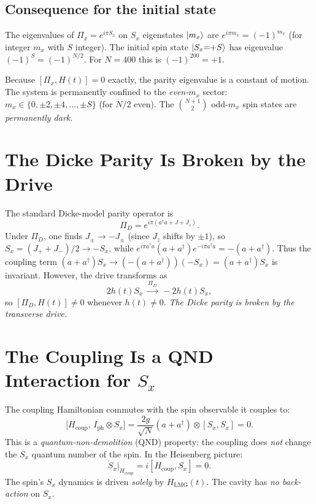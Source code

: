 \documentclass[12pt]{article}
\begin{document}
\subsection{Consequence for the initial state}

The eigenvalues of $\Pi_x=e^{i\pi S_x}$ on $S_x$ eigenstates $\ket{m_x}$ are
$e^{i\pi m_x}=(-1)^{m_x}$ (for integer $m_x$ with $S$ integer).
The initial spin state $\ket{S_x{=}{+}S}$ has eigenvalue
$(-1)^{S}=(-1)^{N/2}$.  For $N=400$ this is $(-1)^{200}=+1$.

Because $[\Pi_x,H(t)]=0$ exactly, the parity eigenvalue is a constant of
motion.  The system is permanently confined to the \emph{even-$m_x$}
sector: $m_x \in \{0,\pm2,\pm4,\ldots,\pm S\}$ (for $N/2$ even).
The $\binom{N+1}{2}$ odd-$m_x$ spin states are \emph{permanently dark}.

\section{The Dicke Parity Is Broken by the Drive}

The standard Dicke-model parity operator is
\begin{equation}
  \Pi_D = e^{i\pi(a^\dagger a + J + J_z)}.
\end{equation}
Under $\Pi_D$, one finds $J_\pm \to -J_\pm$ (since $J_z$ shifts by $\pm1$), so
$S_x = (J_++J_-)/2 \to -S_x$, while
$e^{i\pi a^\dagger a}(a+a^\dagger)e^{-i\pi a^\dagger a}=-(a+a^\dagger)$.
Thus the coupling term $(a+a^\dagger)S_x\to(-(a+a^\dagger))(-S_x)=(a+a^\dagger)S_x$
is invariant.  However, the drive transforms as
\begin{equation}
  2h(t)S_x \;\xrightarrow{\Pi_D}\; -2h(t)S_x ,
\end{equation}
so $[\Pi_D, H(t)]\ne 0$ whenever $h(t)\ne 0$.
\emph{The Dicke parity is broken by the transverse drive.}

\section{The Coupling Is a QND Interaction for $S_x$}

The coupling Hamiltonian commutes with the spin observable it couples to:
\begin{equation}
  \bigl[H_\text{coup},\,I_\text{ph}\otimes S_x\bigr]
  = \frac{2g}{\sqrt{N}}(a+a^\dagger)\otimes[S_x,S_x] = 0 .
\end{equation}
This is a \emph{quantum-non-demolition} (QND) property: the coupling does
\emph{not} change the $S_x$ quantum number of the spin.  In the Heisenberg
picture:
\begin{equation}
  \dot S_x \Big|_{H_\text{coup}} = i[H_\text{coup},S_x] = 0 .
\end{equation}
The spin's $S_x$ dynamics is driven \emph{solely} by $H_\text{LMG}(t)$.
The cavity has \emph{no back-action} on $S_x$.
\end{document}
